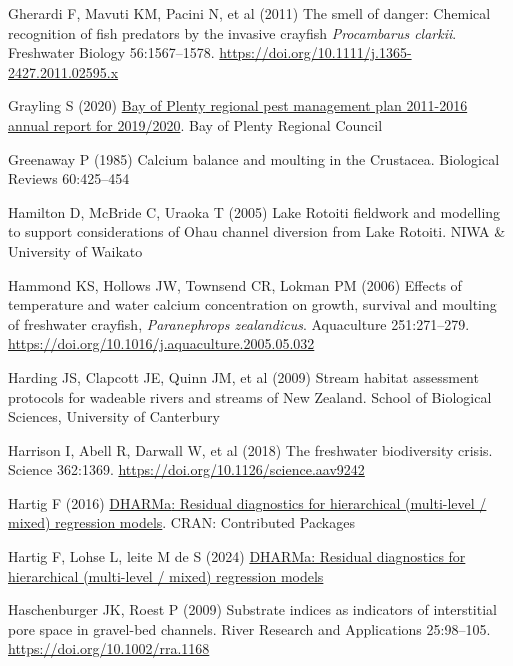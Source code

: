 \documentclass[
  12pt,
  a4paper,
]{scrbook}
\newlength{\cslhangindent}
\newenvironment{CSLReferences}[2] %
 {\begin{list}{}{%
  \setlength{\itemindent}{0pt}
  \setlength{\leftmargin}{0pt}
  \setlength{\parsep}{0pt}
  \ifodd #1
   \setlength{\leftmargin}{\cslhangindent}
   \setlength{\itemindent}{-1\cslhangindent}
  \fi
  \setlength{\itemsep}{#2\baselineskip}}}
 {\end{list}}
\begin{document}
\begin{CSLReferences}{1}{1}
Gherardi F, Mavuti KM, Pacini N, et al (2011) The smell of danger:
Chemical recognition of fish predators by the invasive crayfish
{\emph{Procambarus clarkii}}. Freshwater Biology 56:1567--1578.
\url{https://doi.org/10.1111/j.1365-2427.2011.02595.x}

Grayling S (2020)
\href{https://atlas.boprc.govt.nz/api/v1/edms/document/A3651696/content}{{Bay
of Plenty} regional pest management plan 2011-2016 annual report for
2019/2020}. Bay of Plenty Regional Council

Greenaway P (1985) Calcium balance and moulting in the {Crustacea}.
Biological Reviews 60:425--454

Hamilton D, McBride C, Uraoka T (2005) {Lake Rotoiti} fieldwork and
modelling to support considerations of {Ohau} channel diversion from
{Lake Rotoiti}. NIWA \& University of Waikato

Hammond KS, Hollows JW, Townsend CR, Lokman PM (2006) Effects of
temperature and water calcium concentration on growth, survival and
moulting of freshwater crayfish, {\emph{Paranephrops zealandicus}}.
Aquaculture 251:271--279.
\url{https://doi.org/10.1016/j.aquaculture.2005.05.032}

Harding JS, Clapcott JE, Quinn JM, et al (2009) Stream habitat
assessment protocols for wadeable rivers and streams of {New Zealand}.
School of Biological Sciences, University of Canterbury

Harrison I, Abell R, Darwall W, et al (2018) The freshwater biodiversity
crisis. Science 362:1369. \url{https://doi.org/10.1126/science.aav9242}

Hartig F (2016)
\href{https://doi.org/10.32614/cran.package.dharma}{{DHARMa}: Residual
diagnostics for hierarchical (multi-level / mixed) regression models}.
CRAN: Contributed Packages

{Hartig F, Lohse L, leite M de S} (2024)
\href{https://cran.r-project.org/web/packages/DHARMa/index.html}{DHARMa:
Residual diagnostics for hierarchical (multi-level / mixed) regression
models}

Haschenburger JK, Roest P (2009) Substrate indices as indicators of
interstitial pore space in gravel-bed channels. River Research and
Applications 25:98--105. \url{https://doi.org/10.1002/rra.1168}


\end{CSLReferences}
\end{document}
